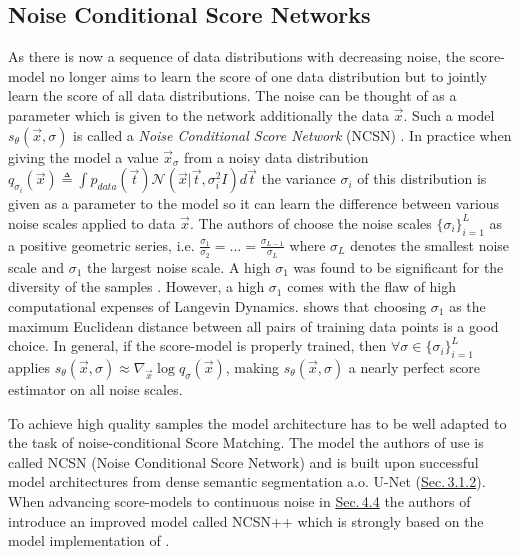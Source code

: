 \subsection{Noise Conditional Score Networks} \label{sec:4.3.1}
As there is now a sequence of data distributions with decreasing noise, the score-model no longer aims to learn the score of one data distribution but to jointly learn the score of all data distributions. The noise can be thought of as a parameter which is given to the network additionally the data $\vec{x}$. Such a model $s_\theta(\vec{x}, \sigma)$ is called a \textit{Noise Conditional Score Network} (NCSN) \cite{score_1}. In practice when giving the model a value $\vec{x}_\sigma$ from a noisy data distribution $q_{\sigma_i}(\vec{x})\triangleq\int p_{data}(\vec{t})\mathcal{N}(\vec{x}|\vec{t},\sigma_i^2I)d\vec{t}$ the variance $\sigma_i$ of this distribution is given as a parameter to the model so it can learn the difference between various noise scales applied to data $\vec{x}$. The authors of \cite{score_1} choose the noise scales $\{\sigma_i\}_{i=1}^L$ as a positive geometric series, i.e. $\frac{\sigma_1}{\sigma_2}=\dots=\frac{\sigma_{L-1}}{\sigma_L}$ where $\sigma_L$ denotes the smallest noise scale and $\sigma_1$ the largest noise scale. A high $\sigma_1$ was found to be significant for the diversity of the samples \cite{score_2}. However, a high $\sigma_1$ comes with the flaw of high computational expenses of Langevin Dynamics. \cite{score_2} shows that choosing $\sigma_1$ as the maximum Euclidean distance between all pairs of training data points is a good choice. In general, if the score-model is properly trained, then $\forall\sigma\in\{\sigma_i\}_{i=1}^L$ applies $s_\theta(\vec{x}, \sigma)\approx\nabla_{\vec{x}}\log q_\sigma(\vec{x})$, making $s_\theta(\vec{x},\sigma)$ a nearly perfect score estimator on all noise scales. 

To achieve high quality samples the model architecture has to be well adapted to the task of noise-conditional Score Matching. The model the authors of \cite{score_1} use is called NCSN (Noise Conditional Score Network) and is built upon successful model architectures from dense semantic segmentation a.o. U-Net (\hyperref[sec:3.1.2]{Sec.\,3.1.2}). When advancing score-models to continuous noise in \hyperref[sec:4.4]{Sec.\,4.4} the authors of \cite{score_3} introduce an improved model called NCSN++ which is strongly based on the model implementation of \cite{ho2020denoising}.

